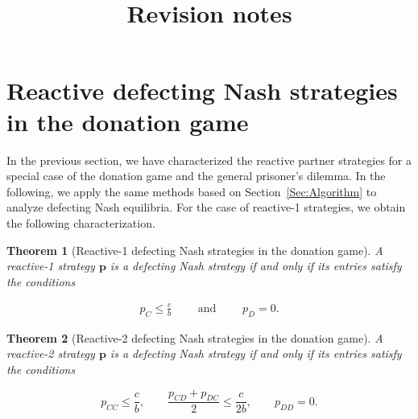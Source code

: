\documentclass[11pt]{article}
\title{~\\[-1.5cm]{\sffamily \Large Revision notes}\\[-0.3cm]}
\date{\empty}
\theoremstyle{plainCl1}
\newtheorem{theorem}{Theorem}
\theoremstyle{plainCl2}
\begin{document}

\section{Reactive defecting Nash strategies in the donation game}\label{section:defecting_donation_game}

In the previous section, we have characterized the reactive partner strategies
for a special case of the donation game and the general prisoner's dilemma. In
the following, we apply the same methods based on Section~\ref{Sec:Algorithm} to
analyze defecting Nash equilibria. For the case of reactive-1 strategies, we
obtain the following characterization.


\begin{theorem}[Reactive-1 defecting Nash strategies in the donation game]
\label{theorem:reactive_one_defecting_strategies}
A reactive-1 strategy $\mathbf{p}$ is a defecting Nash strategy if and only if
its entries satisfy the conditions

\begin{equation}
  \begin{array}{rcl}
    p_{C} \le  \frac{c}{b} \qquad \text{ and } \qquad  p_{D} \!=\! 0.
\end{array}
\end{equation}
\end{theorem}



\begin{theorem}[Reactive-2 defecting Nash strategies in the donation game]
\label{theorem:reactive_two_defecting_strategies}
A reactive-2 strategy $\mathbf{p}$ is a defecting Nash strategy if and only if
its entries satisfy the conditions

\begin{equation}\label{eq:defecting_conditions_two}
  p_{CC} \le \frac{c}{b}, \qquad \displaystyle \frac{p_{CD} \!+\! p_{DC}}{2} \le \frac{c}{2b}, \qquad p_{DD} = 0.
\end{equation}
\end{theorem}

\end{document}
